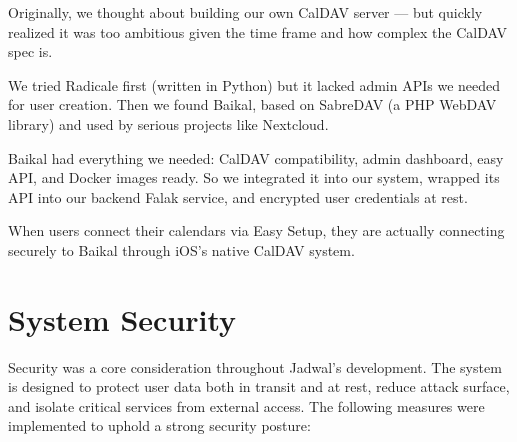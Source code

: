 Originally, we thought about building our own CalDAV server — but quickly realized it was too ambitious given the time frame and how complex the CalDAV spec is.

We tried Radicale first (written in Python) but it lacked admin APIs we needed for user creation. Then we found Baikal, based on SabreDAV (a PHP WebDAV library) and used by serious projects like Nextcloud.

Baikal had everything we needed: CalDAV compatibility, admin dashboard, easy API, and Docker images ready. So we integrated it into our system, wrapped its API into our backend Falak service, and encrypted user credentials at rest.

When users connect their calendars via Easy Setup, they are actually connecting securely to Baikal through iOS’s native CalDAV system.

\section{System Security}

Security was a core consideration throughout Jadwal's development. The system is designed to protect user data both in transit and at rest, reduce attack surface, and isolate critical services from external access. The following measures were implemented to uphold a strong security posture:

